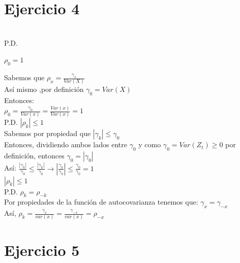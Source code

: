 \documentclass{article}
\begin{document}
\section{Ejercicio 4}\\

P.D.


$\rho_0 = 1$


Sabemos que $\rho_x = \frac{\gamma_x}{Var(X)}$\\

As{í} mismo ,por definici{ó}n   $\gamma_0 = Var(X)$\\

Entonces:\\

$\rho_0 = \frac{\gamma_0}{Var(x)} =\frac{Var(x)}{Var(x)}=1 $\\

P.D.  $|\rho_k| \leq 1$\\

Sabemos por propiedad que  $|\gamma_k|\leq \gamma_0$\\


Entonces, dividiendo ambos lados entre $\gamma_0$ y como $\gamma_0 = Var(Z_t) \geq 0$ por definici{ó}n, entonces $\gamma_0=|\gamma_0| $\\


As{í}: $\frac{|\gamma_k|}{\gamma_0} \leq \frac{|\gamma_k|}{\gamma_0} \rightarrow |\frac{\gamma_k}{\gamma_0}| \leq \frac{\gamma_0}{\gamma_0}=1 $\\


\rightarrow  $|\rho_k| \leq 1$ \\


P.D.  $\rho_k= \rho_{-k}$\\

Por propiedades de la función de autocovarianza tenemos que: $ \gamma_x = \gamma_{-x}$ \\


As{í},  $\rho_k = \frac{\gamma_x}{var(x)} = \frac{\gamma_{-x}}{var(x)} = \rho_{-x}$\\

\section{Ejercicio 5} \\
\end{document}
